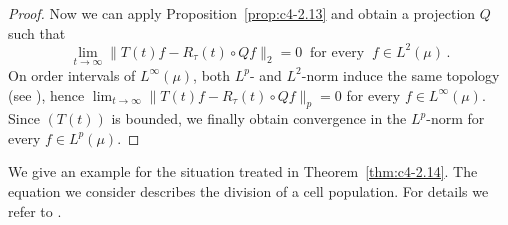 \begin{proof}
Now we can apply Proposition~\ref{prop:c4-2.13} and obtain a projection $Q$ such that 
\[ 
\lim_{t \to \infty}\|T(t)f - R_{\tau}(t) \circ Qf\|_{2} = 0 \ \text{ for every 
} \ f \in L^{2}(\mu)\,.
\]
On order intervals of\/ $L^{\infty}(\mu)$, both $L^{p}$- and $L^{2}$-norm induce the same topology (see \textcite[V.8.3]{schaefer:1974}), 
hence $\lim_{t \to \infty} \|T(t)f - R_{\tau}(t) \circ Qf\|_{p} = 0$ for every $f \in L^{\infty}(\mu)$.
Since $(T(t))$ is bounded, we finally obtain convergence in the $L^{p}$-norm for every $f \in L^{p}(\mu)$.
\end{proof}
%
We give an example for the situation treated in Theorem~\ref{thm:c4-2.14}.
The equation we consider describes the division of a cell population.
For details we refer to \textcite{diekmannetal:1984}.
